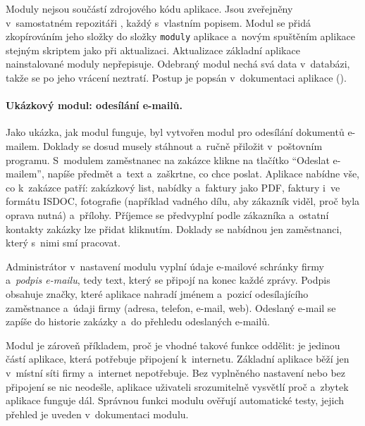 Moduly nejsou součástí zdrojového kódu aplikace. Jsou zveřejněny v~samostatném repozitáři , každý s~vlastním popisem. Modul se přidá zkopírováním jeho složky do složky \texttt{moduly} aplikace a~novým spuštěním aplikace stejným skriptem jako při aktualizaci. Aktualizace základní aplikace nainstalované moduly nepřepisuje. Odebraný modul nechá svá data v~databázi, takže se po jeho vrácení neztratí. Postup je popsán v~dokumentaci aplikace ().

\paragraph{Ukázkový modul: odesílání e-mailů.} Jako ukázka, jak modul funguje, byl vytvořen modul pro odesílání dokumentů e-mailem. Doklady se dosud musely stáhnout a~ručně přiložit v~poštovním programu. S~modulem zaměstnanec na zakázce klikne na tlačítko \enquote{Odeslat e-mailem}, napíše předmět a~text a~zaškrtne, co chce poslat. Aplikace nabídne vše, co k~zakázce patří: zakázkový list, nabídky a~faktury jako PDF, faktury i~ve formátu ISDOC, fotografie (například vadného dílu, aby zákazník viděl, proč byla oprava nutná) a~přílohy. Příjemce se předvyplní podle zákazníka a~ostatní kontakty zakázky lze přidat kliknutím. Doklady se nabídnou jen zaměstnanci, který s~nimi smí pracovat.

Administrátor v~nastavení modulu vyplní údaje e-mailové schránky firmy a~\emph{podpis e-mailu}, tedy text, který se připojí na konec každé zprávy. Podpis obsahuje značky, které aplikace nahradí jménem a~pozicí odesílajícího zaměstnance a~údaji firmy (adresa, telefon, e-mail, web). Odeslaný e-mail se zapíše do historie zakázky a~do přehledu odeslaných e-mailů.

Modul je zároveň příkladem, proč je vhodné takové funkce oddělit: je jedinou částí aplikace, která potřebuje připojení k~internetu. Základní aplikace běží jen v~místní síti firmy a~internet nepotřebuje. Bez vyplněného nastavení nebo bez připojení se nic neodešle, aplikace uživateli srozumitelně vysvětlí proč a~zbytek aplikace funguje dál. Správnou funkci modulu ověřují automatické testy, jejich přehled je uveden v~dokumentaci modulu.

